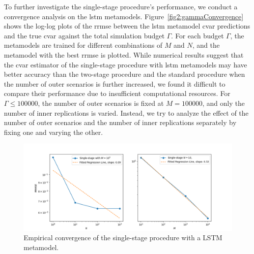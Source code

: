 To further investigate the single-stage procedure's performance, we conduct a convergence analysis on the \gls{lstm} metamodels.
Figure~\ref{fig2:gammaConvergence} shows the log-log plots of the \gls{rrmse} between the \gls{lstm} metamodel \gls{cvar} predictions and the true \gls{cvar} against the total simulation budget $\Gamma$.
For each budget $\Gamma$, the metamodels are trained for different combinations of $M$ and $N$, and the metamodel with the best \gls{rrmse} is plotted.
While numerical results suggest that the \gls{cvar} estimator of the single-stage procedure with \gls{lstm} metamodels may have better accuracy than the two-stage procedure and the standard procedure when the number of outer scenarios is further increased, we found it difficult to compare their performance due to insufficient computational resources.
For $\Gamma \leq \num{100000}$, the number of outer scenarios is fixed at $M = \num{100000}$, and only the number of inner replications is varied.
Instead, we try to analyze the effect of the number of outer scenarios and the number of inner replications separately by fixing one and varying the other.

\begin{figure}[ht!]
    \centering
    \includegraphics[width=\textwidth]{./project2/figures/singleStage/MSEConvergence_lstmLoCap_MN.png}
    \caption{Empirical convergence of the single-stage procedure with a LSTM metamodel.} 
    \label{fig2:mnConvergence}
\end{figure}


